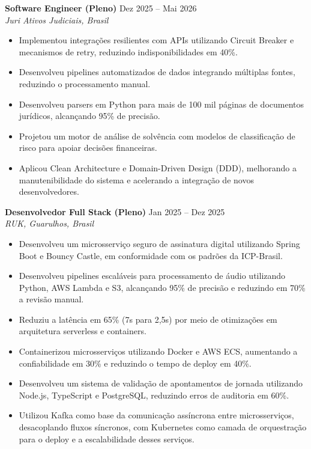 \documentclass[10pt,letterpaper]{article}
\begin{document}
\textbf{Software Engineer (Pleno)} \hfill Dez 2025 -- Mai 2026 \\
\textit{Juri Ativos Judiciais, Brasil}
\begin{itemize}[leftmargin=*, itemsep=2pt]
    \item Implementou integrações resilientes com APIs utilizando Circuit Breaker e mecanismos de retry, reduzindo indisponibilidades em 40\%.
    \item Desenvolveu pipelines automatizados de dados integrando múltiplas fontes, reduzindo o processamento manual.
    \item Desenvolveu parsers em Python para mais de 100 mil páginas de documentos jurídicos, alcançando 95\% de precisão.
    \item Projetou um motor de análise de solvência com modelos de classificação de risco para apoiar decisões financeiras.
    \item Aplicou Clean Architecture e Domain-Driven Design (DDD), melhorando a manutenibilidade do sistema e acelerando a integração de novos desenvolvedores.
\end{itemize}

\textbf{Desenvolvedor Full Stack (Pleno)} \hfill Jan 2025 -- Dez 2025 \\
\textit{RUK, Guarulhos, Brasil}
\begin{itemize}[leftmargin=*, itemsep=2pt]
    \item Desenvolveu um microsserviço seguro de assinatura digital utilizando Spring Boot e Bouncy Castle, em conformidade com os padrões da ICP-Brasil.
    \item Desenvolveu pipelines escaláveis para processamento de áudio utilizando Python, AWS Lambda e S3, alcançando 95\% de precisão e reduzindo em 70\% a revisão manual.
    \item Reduziu a latência em 65\% (7s para 2,5s) por meio de otimizações em arquitetura serverless e containers.
    \item Containerizou microsserviços utilizando Docker e AWS ECS, aumentando a confiabilidade em 30\% e reduzindo o tempo de deploy em 40\%.
    \item Desenvolveu um sistema de validação de apontamentos de jornada utilizando Node.js, TypeScript e PostgreSQL, reduzindo erros de auditoria em 60\%.
    \item Utilizou Kafka como base da comunicação assíncrona entre microsserviços, desacoplando fluxos síncronos, com Kubernetes como camada de orquestração para o deploy e a escalabilidade desses serviços.
\end{itemize}
\end{document}
